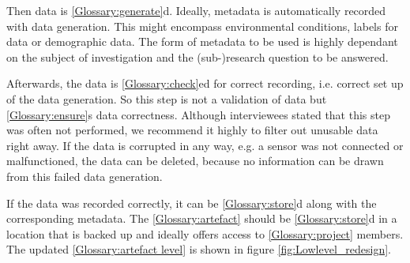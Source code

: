 \documentclass{bausteinefdm}
\begin{document}
Then data is \ref{Glossary:generate}d.
Ideally, metadata is automatically recorded with data generation.
This might encompass environmental conditions, labels for data or demographic data.
The form of metadata to be used is highly dependant on the subject of investigation and the (sub-)research question to be answered.

Afterwards, the data is \ref{Glossary:check}ed for correct recording, i.e. correct set up of the data generation.
So this step is not a validation of data but \ref{Glossary:ensure}s data correctness.
Although interviewees stated that this step was often not performed, we recommend it highly to filter out unusable data right away.
If the data is corrupted in any way, e.g. a sensor was not connected or malfunctioned, the data can be deleted, because no information can be drawn from this failed data generation.

If the data was recorded correctly, it can be \ref{Glossary:store}d along with the corresponding metadata.
The \ref{Glossary:artefact} should be \ref{Glossary:store}d in a location that is backed up and ideally offers access to \ref{Glossary:project} members.
The updated \ref{Glossary:artefact level} is shown in figure \ref{fig:Lowlevel_redesign}.
\end{document}
